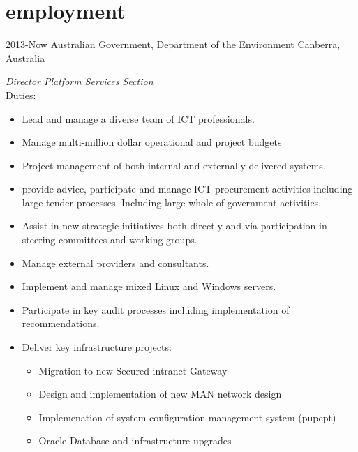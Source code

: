 \documentclass[]{friggeri-cv} %
\begin{document}

\section{employment}
\begin{entrylist}
\entry
{2013-Now}
{Australian Government, Department of the Environment}
{Canberra, Australia}
{\emph{Director Platform Services Section} \\
Duties:
\begin{itemize}
\item Lead and manage a diverse team of ICT professionals.
\item Manage multi-million dollar operational and project budgets
\item Project management of both internal and externally delivered systems.
\item provide advice, participate and manage ICT procurement activities including large tender processes. Including large whole of government activities.
\item Assist in new strategic initiatives both directly and via participation in steering committees and working groups.
\item Manage external providers and consultants.
\item Implement and manage mixed Linux and Windows servers.
\item Participate in key audit processes including implementation of recommendations.
\item Deliver key infrastructure projects:
\begin{itemize}
\item Migration to new Secured intranet Gateway
\item Design and implementation of new MAN network design
\item Implemenation of system configuration management system (pupept)
\item Oracle Database and infrastructure upgrades
\end{itemize}
\end{itemize}}
\end{entrylist}
\end{document}
